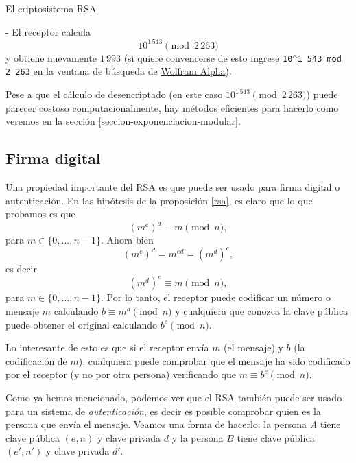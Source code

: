 \begin{section}{El criptosistema RSA}
\begin{ejemplo*}
- El receptor calcula
$$
10^{1\,543} \pmod{2\,263}
$$ 
y obtiene nuevamente $1\,993$ (si quiere convencerse de esto ingrese \texttt{10\^{}1\,543 mod 2\,263} en la ventana de búsqueda de \href{https://www.wolframalpha.com}{Wolfram Alpha}).

Pese a que el cálculo de desencriptado (en este caso $10^{1\,543} \pmod{2\,263}$) puede parecer costoso computacionalmente, hay métodos eficientes para hacerlo como veremos en la sección \ref{seccion-exponenciacion-modular}. 

\end{ejemplo*}

\subsection*{Firma digital}
Una propiedad importante del RSA es que puede ser usado para firma digital o autenticación. En las hipótesis de la proposición \ref{rsa}, es claro que lo que probamos es que 
$$
(m^e)^d \equiv m \pmod{n},
$$
para $m \in \{0,\ldots,n-1\}$. Ahora bien 
$$
(m^e)^d  = m^{ed} = (m^d)^e,  
$$
es decir
$$
(m^d)^e \equiv m \pmod{n}, 
$$
para $m \in \{0,\ldots,n-1\}$. Por lo tanto, el receptor puede codificar un número o mensaje $m$ calculando  $b \equiv m^d  \pmod{n}$ y cualquiera que conozca la clave pública puede obtener el original calculando $b^e \pmod{n}$. 

Lo interesante de esto es que si el receptor envía $m$ (el mensaje) y $b$ (la codificación de $m$), cualquiera puede comprobar que el mensaje ha sido codificado por el receptor (y no por otra persona) verificando  que   $m \equiv b^e \pmod{n}$.     


\begin{ejemplo*}
Como ya hemos mencionado, podemos ver que el RSA también puede ser usado para un sistema de \emph{autenticación}, es decir es posible comprobar quien es la persona que envía el mensaje. Veamos una forma de hacerlo: la persona $A$ tiene clave pública $(e,n)$ y clave privada $d$ y   la persona $B$  tiene clave pública $(e',n')$ y clave privada $d'$. 


\end{ejemplo*}
\end{section}
